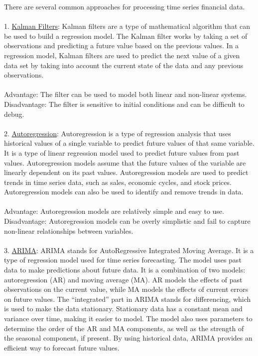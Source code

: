 \documentclass{article}
\begin{document}
There are several common approaches for processing time series financial data.\\
\\
1. \href{https://www.atlantis-press.com/proceedings/kam-15/25464}{Kalman Filters}: Kalman filters are a type of mathematical algorithm that can be used to build a regression model. The Kalman filter works by taking a set of observations and predicting a future value based on the previous values. In a regression model, Kalman filters are used to predict the next value of a given data set by taking into account the current state of the data and any previous observations.\\
\\
Advantage: The filter can be used to model both linear and non-linear systems.\\
Disadvantage: The filter is sensitive to initial conditions and can be difficult to debug.\\
\\
2. \href{https://link.springer.com/article/10.1007/s11403-021-00342-5}{Autoregression}: Autoregression is a type of regression analysis that uses historical values of a single variable to predict future values of that same variable. It is a type of linear regression model used to predict future values from past values. Autoregression models assume that the future values of the variable are linearly dependent on its past values. Autoregression models are used to predict trends in time series data, such as sales, economic cycles, and stock prices. Autoregression models can also be used to identify and remove trends in data.\\
\\
Advantage: Autoregression models are relatively simple and easy to use.\\
Disadvantage: Autoregression models can be overly simplistic and fail to capture non-linear relationships between variables.\\
\\
3. \href{https://www.sciencedirect.com/science/article/pii/S2210832714000258}{ARIMA}: ARIMA stands for AutoRegressive Integrated Moving Average. It is a type of regression model used for time series forecasting. The model uses past data to make predictions about future data. It is a combination of two models: autoregression (AR) and moving average (MA). AR models the effects of past observations on the current value, while MA models the effects of current errors on future values. The “integrated” part in ARIMA stands for differencing, which is used to make the data stationary. Stationary data has a constant mean and variance over time, making it easier to model. The model also uses parameters to determine the order of the AR and MA components, as well as the strength of the seasonal component, if present. By using historical data, ARIMA provides an efficient way to forecast future values.\\
\end{document}
